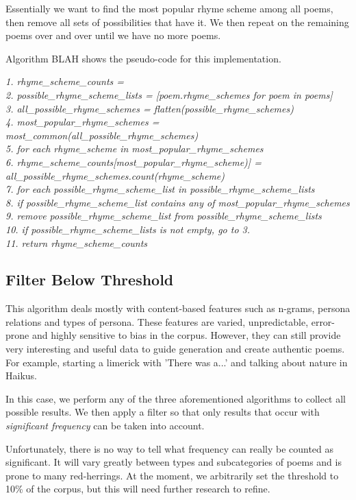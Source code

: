 Essentially we want to find the most popular rhyme scheme among all poems, then remove all sets of possibilities that have it. We then repeat on the remaining poems over and over until we have no more poems. 

Algorithm BLAH shows the pseudo-code for this implementation.

\textit{
 1. rhyme\_scheme\_counts = {}\\
 2. possible\_rhyme\_scheme\_lists = [poem.rhyme\_schemes for poem in poems]\\
 3. all\_possible\_rhyme\_schemes = flatten(possible\_rhyme\_schemes)\\
 4. most\_popular\_rhyme\_schemes = most\_common(all\_possible\_rhyme\_schemes)\\
 5. for each rhyme\_scheme in most\_popular\_rhyme\_schemes\\
 6. 		rhyme\_scheme\_counts[most\_popular\_rhyme\_scheme)] = all\_possible\_rhyme\_schemes.count(rhyme\_scheme)\\
 7. for each possible\_rhyme\_scheme\_list in possible\_rhyme\_scheme\_lists\\
 8.		if possible\_rhyme\_scheme\_list contains any of  most\_popular\_rhyme\_schemes\\
 9.			remove possible\_rhyme\_scheme\_list from possible\_rhyme\_scheme\_lists\\
10. if possible\_rhyme\_scheme\_lists is not empty, go to 3.\\
11. return rhyme\_scheme\_counts\\
}


\subsection{Filter Below Threshold}

This algorithm deals mostly with content-based features such as n-grams, persona relations and types of persona. These features are varied, unpredictable, error-prone and highly sensitive to bias in the corpus. However, they can still provide very interesting and useful data to guide generation and create authentic poems. For example, starting a limerick with 'There was a...' and talking about nature in Haikus.

In this case, we perform any of the three aforementioned algorithms to collect all possible results. We then apply a filter so that only results that occur with \textit{significant frequency} can be taken into account.

Unfortunately, there is no way to tell what frequency can really be counted as significant. It will vary greatly between types and subcategories of poems and is prone to many red-herrings. At the moment, we arbitrarily set the threshold to 10\% of the corpus, but this will need further research to refine.

